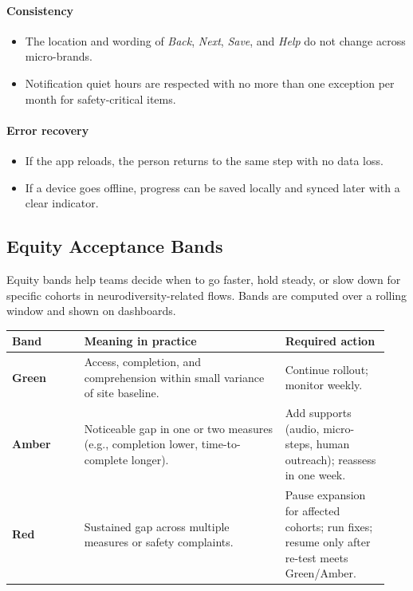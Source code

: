 \documentclass[12pt]{article}
\begin{document}
\paragraph{Consistency}
\begin{itemize}[leftmargin=*]
  \item The location and wording of \emph{Back}, \emph{Next}, \emph{Save}, and \emph{Help} do not change across micro-brands.
  \item Notification quiet hours are respected with no more than one exception per month for safety-critical items.
\end{itemize}

\paragraph{Error recovery}
\begin{itemize}[leftmargin=*]
  \item If the app reloads, the person returns to the same step with no data loss.
  \item If a device goes offline, progress can be saved locally and synced later with a clear indicator.
\end{itemize}

\subsection*{Equity Acceptance Bands}
Equity bands help teams decide when to go faster, hold steady, or slow down for specific cohorts in neurodiversity-related flows. Bands are computed over a rolling window and shown on dashboards.

\begin{longtable}{@{}p{0.18\linewidth}p{0.50\linewidth}p{0.26\linewidth}@{}}
\toprule
\textbf{Band} & \textbf{Meaning in practice} & \textbf{Required action} \\
\midrule
\endhead
\textbf{Green} & Access, completion, and comprehension within small variance of site baseline. & Continue rollout; monitor weekly. \\
\textbf{Amber} & Noticeable gap in one or two measures (e.g., completion lower, time-to-complete longer). & Add supports (audio, micro-steps, human outreach); reassess in one week. \\
\textbf{Red} & Sustained gap across multiple measures or safety complaints. & Pause expansion for affected cohorts; run fixes; resume only after re-test meets Green/Amber. \\
\bottomrule
\end{longtable}
\end{document}
